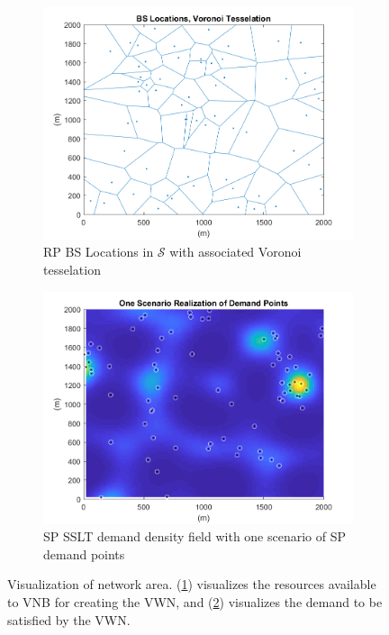 \documentclass[onecolumn,draftcls]{IEEEtran}
\begin{document}
\begin{figure}[h]
\begin{subfigure}{.5\textwidth}
	\centering
	\includegraphics[width=.8\linewidth]{Figures/BSLocationsVoronoi}
	\caption{RP BS Locations in $\mathcal{S}$ with associated Voronoi tesselation}
	\label{fig:BSLocVor}
\end{subfigure}
\begin{subfigure}{.5\textwidth}
	\centering
	\includegraphics[width=.8\linewidth]{Figures/SSLTnsPPP_demandpointreal}
	\caption{SP SSLT demand density field with one scenario of SP demand points}
	\label{fig:SSLTDPReal}
\end{subfigure}
\caption{Visualization of network area.  (\ref{fig:BSLocVor}) visualizes the resources available to VNB for creating the VWN, and (\ref{fig:SSLTDPReal}) visualizes the demand to be satisfied by the VWN.}
\label{fig:NetworkArea}
\end{figure}
\end{document}

